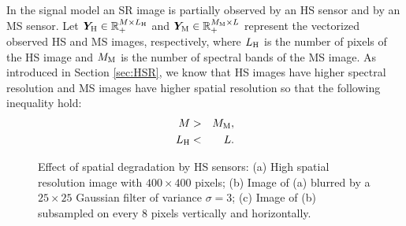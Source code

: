 In the signal model an SR image is partially observed by an HS sensor and by
an MS sensor.
Let $\bm Y_\text H\in\mathbb R_+^{M \times L_\text H}$ and $\bm Y_\text M\in\mathbb R_+^{M_\text M \times L}$
represent the vectorized observed HS and MS images, respectively, where
$L_\text H$ is the number of pixels of the HS image and $M_\text M$ is the
number of spectral bands of the MS image.
As introduced in Section \ref{sec:HSR}, we know that HS images have higher
spectral resolution and MS images have higher spatial resolution so that the
following inequality hold:
\begin{eqnarray}
    M         & > & M_\text M, \\
    L_\text H & < & L.
\end{eqnarray}
\begin{figure}[t]
    \centering
    \caption{Effect of spatial degradation by HS sensors:
             (a) High spatial resolution image with $400 \times 400$ pixels;
             (b) Image of (a) blurred by a $25 \times 25$ Gaussian filter of
                 variance $\sigma = 3$;
             (c) Image of (b) subsampled on every $8$ pixels vertically and
                 horizontally.}
    \label{fig:IMG_DOWNSAMP_down80x80}
\end{figure}

